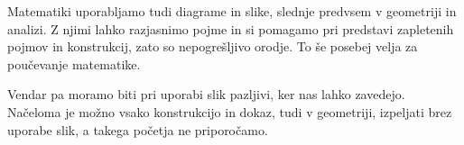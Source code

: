 Matematiki uporabljamo tudi diagrame in slike, slednje predvsem v geometriji in analizi. Z
njimi lahko razjasnimo pojme in si pomagamo pri predstavi zapletenih pojmov in
konstrukcij, zato so nepogrešljivo orodje. To še posebej velja za poučevanje matematike.

Vendar pa moramo biti pri uporabi slik pazljivi, ker nas lahko zavedejo. Načeloma je možno
vsako konstrukcijo in dokaz, tudi v geometriji, izpeljati brez uporabe slik, a takega
početja ne priporočamo.





